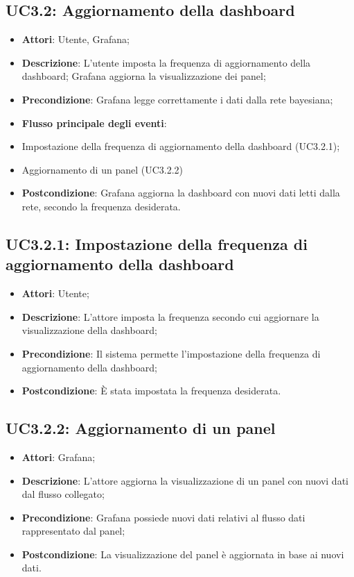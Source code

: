 \subsection{UC3.2: Aggiornamento della dashboard}
\begin{itemize}
	\item \textbf{Attori}: Utente, Grafana;
	\item \textbf{Descrizione}: L'utente imposta la frequenza di aggiornamento della dashboard; Grafana aggiorna la visualizzazione dei panel;
	\item \textbf{Precondizione}: Grafana legge correttamente i dati dalla rete bayesiana;
	\item \textbf{Flusso principale degli eventi}:
		\item Impostazione della frequenza di aggiornamento della dashboard (UC3.2.1);
		\item Aggiornamento di un panel (UC3.2.2)
	\item \textbf{Postcondizione}: Grafana aggiorna la dashboard con nuovi dati letti dalla rete, secondo la frequenza desiderata.
\end{itemize}
\subsection{UC3.2.1: Impostazione della frequenza di aggiornamento della dashboard}
\begin{itemize}
	\item \textbf{Attori}: Utente;
	\item \textbf{Descrizione}: L'attore imposta la frequenza secondo cui aggiornare la visualizzazione della dashboard;
	\item \textbf{Precondizione}: Il sistema permette l'impostazione della frequenza di aggiornamento della dashboard;
	\item \textbf{Postcondizione}: È stata impostata la frequenza desiderata.
\end{itemize}

\subsection{UC3.2.2: Aggiornamento di un panel}
\begin{itemize}
	\item \textbf{Attori}: Grafana;
	\item \textbf{Descrizione}: L'attore aggiorna la visualizzazione di un panel con nuovi dati dal flusso collegato;
	\item \textbf{Precondizione}: Grafana possiede nuovi dati relativi al flusso dati rappresentato dal panel;
	\item \textbf{Postcondizione}: La visualizzazione del panel è aggiornata in base ai nuovi dati.
\end{itemize}